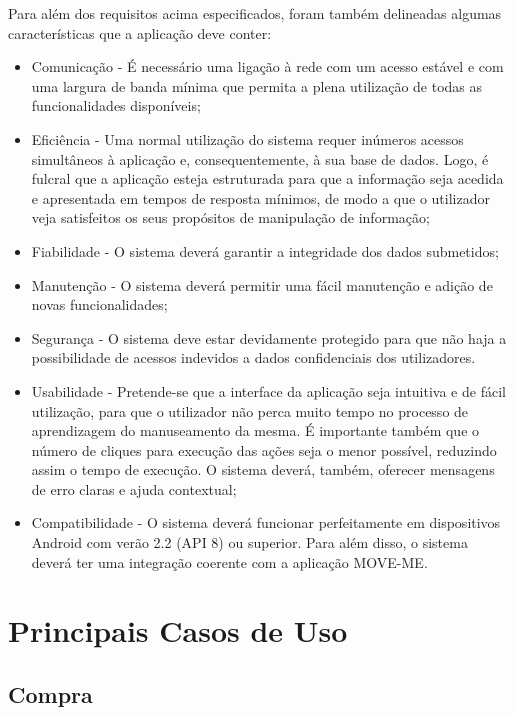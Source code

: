 Para além dos requisitos acima especificados, foram também delineadas algumas características que a aplicação deve conter:
\begin{itemize}
\item Comunicação - É necessário uma ligação à rede com um acesso estável e com uma largura de banda mínima que permita a plena utilização de todas as funcionalidades disponíveis;
\item Eficiência - Uma normal utilização do sistema requer inúmeros acessos simultâneos à aplicação e, consequentemente, à sua base de dados. Logo, é fulcral que a aplicação esteja estruturada para que a informação seja acedida e apresentada em tempos de resposta mínimos, de modo a que o utilizador veja satisfeitos os seus propósitos de manipulação de informação;
\item Fiabilidade - O sistema deverá garantir a integridade dos dados submetidos;
\item Manutenção - O sistema deverá permitir uma fácil manutenção e adição de novas funcionalidades;
\item Segurança - O sistema deve estar devidamente protegido para que não haja a possibilidade de acessos indevidos a dados confidenciais dos utilizadores.
\item Usabilidade - Pretende-se que a interface da aplicação seja intuitiva e de fácil utilização, para que o utilizador não perca muito tempo no processo de aprendizagem do manuseamento da mesma. É importante também que o número de cliques para execução das ações seja o menor possível, reduzindo assim o tempo de execução. O sistema deverá, também, oferecer mensagens de erro claras e ajuda contextual;
\item Compatibilidade - O sistema deverá funcionar perfeitamente em dispositivos Android com verão 2.2 (API 8) ou superior. Para além disso, o sistema deverá ter uma integração coerente com a aplicação MOVE-ME.
\end{itemize}

\section{Principais Casos de Uso}

\subsection{Compra}

